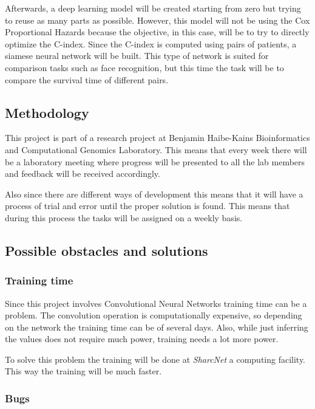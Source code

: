 Afterwards, a deep learning model will be created starting from zero but trying to reuse
as many parts as possible. However, this model will not be using the Cox Proportional
Hazards because the objective, in this case, will be to try to directly optimize the C-index.
Since the C-index is computed using pairs of patients, a siamese neural network will be built.
This type of network is suited for comparison tasks such as face recognition, but this 
time the task will be to compare the survival time of different pairs.

\subsection{Methodology}

This project is part of a research project at Benjamin Haibe-Kains Bioinformatics and 
Computational Genomics Laboratory. This means that every week there will be a laboratory meeting
where progress will be presented to all the lab members and feedback will be received accordingly. 

Also since there are different ways of development this means that it will have a process of trial
and error until the proper solution is found. This means that during this process the
tasks will be assigned on a weekly basis.


\subsection{Possible obstacles and solutions}

\subsubsection{Training time}

Since this project involves Convolutional Neural Networks training time can be a problem. 
The convolution operation is computationally expensive, so depending on the network the 
training time can be of several days. Also, while just inferring the values does not require
much power, training needs a lot more power. 

To solve this problem the training will be done at \emph{SharcNet} a computing facility. 
This way the training will be much faster.

\subsubsection{Bugs}

